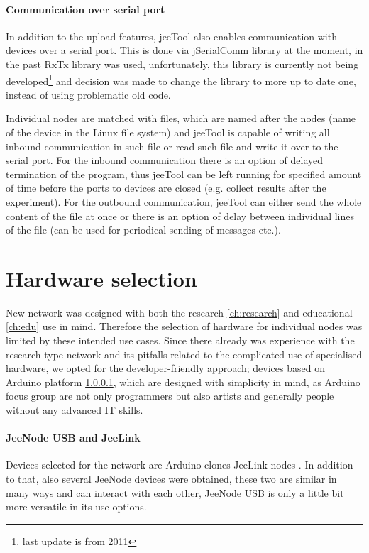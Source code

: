 \documentclass[
  print, %
  table,   %
  nolof,     %
  nolot,     %
           oneside
]{fithesis3}
\begin{document}
\paragraph{Communication over serial port}
  In addition to the upload features, jeeTool also enables communication with devices over a serial port. This is done via jSerialComm library \cite{jserial}
  at the moment, in the past RxTx library \cite{rxtx}
  was used, unfortunately, this library is currently not being developed\footnote{last update is from 2011} and decision was made to change the library to more up to date one, instead of using problematic old code.

  Individual nodes are matched with files, which are named after the nodes (name of the device in the Linux file system) and jeeTool is capable of writing all inbound communication in such file or read such file and write it over to the serial port. For the inbound communication there is an option of delayed termination of the program, thus jeeTool can be left running for specified amount of time before the ports to devices are closed (e.g. collect results after the experiment). For the outbound communication, jeeTool can either send the whole content of the file at once or there is an option of delay between individual lines of the file (can be used for periodical sending of messages etc.).

  \section{Hardware selection}\label{sec:hw}
  New network was designed with both the research \ref{ch:research} and educational \ref{ch:edu} use in mind. Therefore the selection of hardware for individual nodes was limited by these intended use cases. Since there already was experience with the research type network \cite{Matyas2015}
  and its pitfalls related to the complicated use of specialised hardware, we opted for the developer-friendly approach; devices based on Arduino platform \ref{par:jeeLink}, which are designed with simplicity in mind, as Arduino focus group are not only programmers but also artists and generally people without any advanced IT skills.

  \paragraph{JeeNode USB and JeeLink}\label{par:jeeLink} %
  Devices selected for the network are Arduino clones JeeLink nodes \cite{JeeLink}. In addition to that, also several JeeNode devices \cite{JeeNode} were obtained, these two are similar in many ways and can interact with each other, JeeNode USB is only a little bit more versatile in its use options.
\end{document}
